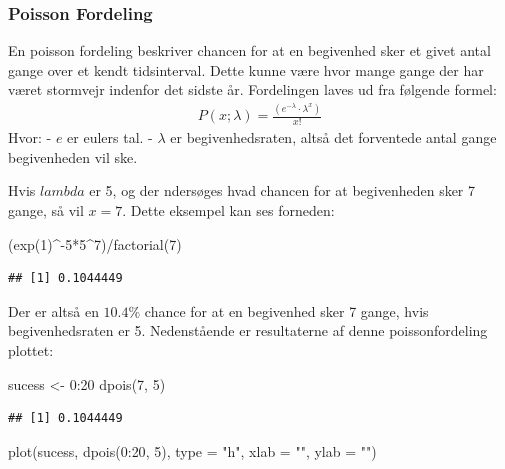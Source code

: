 \documentclass[
]{article}
\newenvironment{Shaded}{\begin{snugshade}}{\end{snugshade}}
\newcommand{\AttributeTok}[1]{\textcolor[rgb]{0.77,0.63,0.00}{#1}}
\newcommand{\DecValTok}[1]{\textcolor[rgb]{0.00,0.00,0.81}{#1}}
\newcommand{\FunctionTok}[1]{\textcolor[rgb]{0.00,0.00,0.00}{#1}}
\newcommand{\NormalTok}[1]{#1}
\newcommand{\OtherTok}[1]{\textcolor[rgb]{0.56,0.35,0.01}{#1}}
\newcommand{\SpecialCharTok}[1]{\textcolor[rgb]{0.00,0.00,0.00}{#1}}
\newcommand{\StringTok}[1]{\textcolor[rgb]{0.31,0.60,0.02}{#1}}
\begin{document}
\hypertarget{poisson-fordeling}{%
\subsubsection{Poisson Fordeling}\label{poisson-fordeling}}

En poisson fordeling beskriver chancen for at en begivenhed sker et
givet antal gange over et kendt tidsinterval. Dette kunne være hvor
mange gange der har været stormvejr indenfor det sidste år. Fordelingen
laves ud fra følgende formel: \[
\begin{aligned}
P(x;\lambda) = \frac{(e^{-\lambda}\cdot\lambda^x)}{x!}
\end{aligned}
\] Hvor: - \(e\) er eulers tal. - \(\lambda\) er begivenhedsraten, altså
det forventede antal gange begivenheden vil ske.

Hvis \(lambda\) er 5, og der ndersøges hvad chancen for at begivenheden
sker 7 gange, så vil \(x=7\). Dette eksempel kan ses forneden:

\begin{Shaded}
\begin{Highlighting}[]
\NormalTok{(}\FunctionTok{exp}\NormalTok{(}\DecValTok{1}\NormalTok{)}\SpecialCharTok{\^{}{-}}\DecValTok{5}\SpecialCharTok{*}\DecValTok{5}\SpecialCharTok{\^{}}\DecValTok{7}\NormalTok{)}\SpecialCharTok{/}\FunctionTok{factorial}\NormalTok{(}\DecValTok{7}\NormalTok{)}
\end{Highlighting}
\end{Shaded}

\begin{verbatim}
## [1] 0.1044449
\end{verbatim}

Der er altså en \(10.4\%\) chance for at en begivenhed sker 7 gange,
hvis begivenhedsraten er 5. Nedenstående er resultaterne af denne
poissonfordeling plottet:

\begin{Shaded}
\begin{Highlighting}[]
\NormalTok{sucess }\OtherTok{\textless{}{-}} \DecValTok{0}\SpecialCharTok{:}\DecValTok{20}
\FunctionTok{dpois}\NormalTok{(}\DecValTok{7}\NormalTok{, }\DecValTok{5}\NormalTok{)}
\end{Highlighting}
\end{Shaded}

\begin{verbatim}
## [1] 0.1044449
\end{verbatim}

\begin{Shaded}
\begin{Highlighting}[]
\FunctionTok{plot}\NormalTok{(sucess, }\FunctionTok{dpois}\NormalTok{(}\DecValTok{0}\SpecialCharTok{:}\DecValTok{20}\NormalTok{, }\DecValTok{5}\NormalTok{), }\AttributeTok{type =} \StringTok{"h"}\NormalTok{, }\AttributeTok{xlab =} \StringTok{""}\NormalTok{, }\AttributeTok{ylab =} \StringTok{""}\NormalTok{)}
\end{Highlighting}
\end{Shaded}
\end{document}
